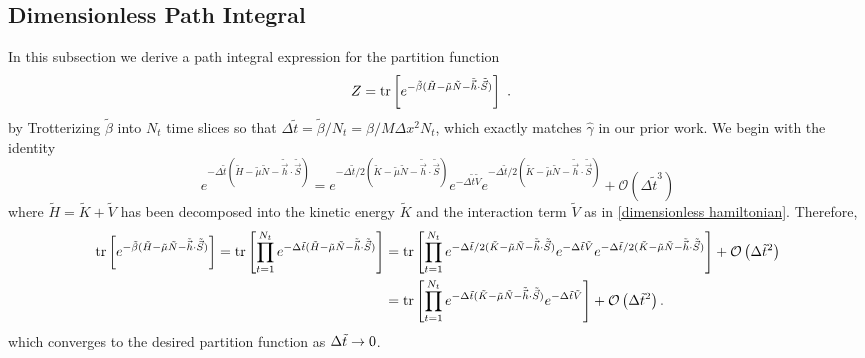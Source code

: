 \subsection{Dimensionless Path Integral}

In this subsection we derive a path integral expression for the partition function
\begin{align}
	Z
	&=
	\text{tr}\left[e^{-\tilde{\beta}(\tilde{H}-\tilde{\mu}\tilde{N} - \tilde{\vec{h}}\cdot\tilde{\vec{S}})}\right]~.
\end{align}
by Trotterizing  $\tilde{\beta}$ into $N_t$ time slices so that $\Delta \tilde{t} = \tilde{\beta}/N_t = \beta/M \Delta x^2 N_t$, which exactly matches $\hat{\gamma}$ in our prior work.
We begin with the identity
\begin{equation}
	e^{-\Delta \tilde{t}(\tilde{H} - \tilde{\mu}\tilde{N} - \tilde{\vec{h}}\cdot\tilde{\vec{S}})}
	=
	e^{-\Delta \tilde{t}/2(\tilde{K} - \tilde{\mu} \tilde{N} - \tilde{\vec{h}}\cdot\tilde{\vec{S}})}
	e^{-\Delta \tilde{t} \tilde{V}}
	e^{-\Delta \tilde{t}/2(\tilde{K} - \tilde{\mu} \tilde{N} - \tilde{\vec{h}}\cdot\tilde{\vec{S}})}
	+
	\mathcal{O}(\Delta \tilde{t}^3) 
\end{equation}
where $\tilde{H} = \tilde{K} + \tilde{V}$ has been decomposed into the kinetic energy $\tilde{K}$ and the interaction term $\tilde{V}$ as in \eqref{dimensionless hamiltonian}.
Therefore,
\begin{align}
	\text{tr}\left[e^{-\tilde{\beta}(\tilde{H}-\tilde{\mu} \tilde{N} - \tilde{\vec{h}}\cdot\tilde{\vec{S}})}\right]
	=
	\text{tr}\left[
		\prod_{t=1}^{N_t}
		e^{-\Delta \tilde{t} (\tilde{H}-\tilde{\mu}\tilde{N} - \tilde{\vec{h}}\cdot\tilde{\vec{S}})}
	\right]
	&=
	\text{tr}\left[
		\prod_{t=1}^{N_t}
		e^{-\Delta \tilde{t}/2(\tilde{K} - \tilde{\mu}\tilde{N} - \tilde{\vec{h}}\cdot\tilde{\vec{S}})}
		e^{-\Delta \tilde{t} \tilde{V}}
		e^{-\Delta \tilde{t}/2(\tilde{K} - \tilde{\mu} \tilde{N} - \tilde{\vec{h}}\cdot\tilde{\vec{S}})}
	\right]
	+ \mathcal{O}\left(\Delta \tilde{t}^2\right)
	\nonumber\\
	&=
	\text{tr}\left[
		\prod_{t=1}^{N_t}
		e^{-\Delta \tilde{t}(\tilde{K} - \tilde{\mu} \tilde{N} - \tilde{\vec{h}}\cdot\tilde{\vec{S}})}
		e^{-\Delta \tilde{t} \tilde{V}}  
	\right]
	+ \mathcal{O}\left(\Delta \tilde{t}^2\right).
	\label{eq:trotterization}
\end{align}
which converges to the desired partition function as $\Delta \tilde{t} \rightarrow 0$.

